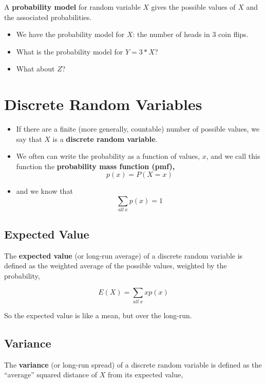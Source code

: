 \documentclass[]{book}
\providecommand{\tightlist}{%
  \setlength{\itemsep}{0pt}\setlength{\parskip}{0pt}}
\begin{document}
A \textbf{probability model} for random variable \(X\) gives the possible values of \(X\) and the associated probabilities.

\begin{itemize}
\tightlist
\item
  We have the probability model for \(X\): the number of heads in 3 coin flips.
\item
  What is the probability model for \(Y= 3*X\)?
\item
  What about \(Z\)?
\end{itemize}

\hypertarget{discrete-random-variables}{%
\section{Discrete Random Variables}\label{discrete-random-variables}}

\begin{itemize}
\item
  If there are a finite (more generally, countable) number of possible values, we say that \(X\) is a \textbf{discrete random variable}.
\item
  We often can write the probability as a function of values, \(x\), and we call this function the \textbf{probability mass function (pmf),}
  \[p(x) = P(X = x)\]
\item
  and we know that
  \[\sum_{all~x}p(x) = 1\]
\end{itemize}

\hypertarget{expected-value}{%
\subsection{Expected Value}\label{expected-value}}

The \textbf{expected value} (or long-run average) of a discrete random variable is defined as the weighted average of the possible values, weighted by the probability,

\[E(X) = \sum_{all~x} xp(x)\]

So the expected value is like a mean, but over the long-run.

\hypertarget{variance}{%
\subsection{Variance}\label{variance}}

The \textbf{variance} (or long-run spread) of a discrete random variable is defined as the ``average'' squared distance of \(X\) from its expected value,
\end{document}
